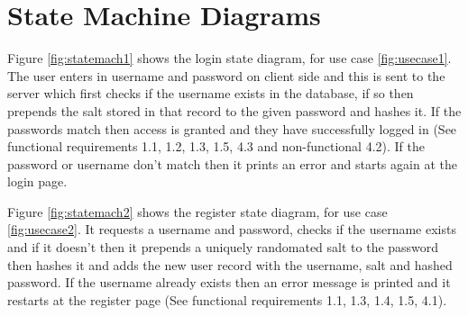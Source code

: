 \documentclass[10pt, notitlepage]{report}
\begin{document}
\section{State Machine Diagrams}

Figure \ref{fig:statemach1} shows the login state diagram, for use case \ref{fig:usecase1}. The  user enters in username and password on client side and this is sent to the server which first checks if the username exists in the database, if so then prepends the salt stored in that record to the given password and hashes it. If the passwords match then access is granted and they have successfully logged in (See functional requirements 1.1, 1.2, 1.3, 1.5, 4.3 and non-functional 4.2). If the password or username don’t match then it prints an error and starts again at the login page.

Figure \ref{fig:statemach2} shows the register state diagram, for use case \ref{fig:usecase2}. It requests a username and password, checks if the username exists and if it doesn’t then it prepends a uniquely randomated salt to the password then hashes it and adds the new user record with the username, salt and hashed password. If the username already exists then an error message is printed and it restarts at the register page (See functional requirements 1.1, 1.3, 1.4, 1.5, 4.1).
\end{document}
